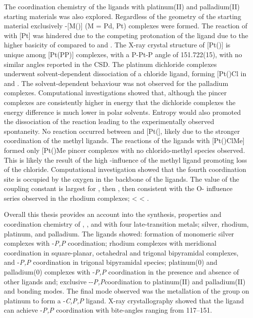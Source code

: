 The coordination chemistry of the \tBuxantphos{} ligands with platinum(II) and palladium(II) starting materials was also explored.  Regardless of the geometry of the starting material exclusively \trans{}-[M(\tBuxantphos)] (M = Pd, Pt) complexes were formed.  The reaction of \tBusixantphos{} with [Pt] was hindered due to the competing protonation of the ligand due to the higher basicity of \tBusixantphos{} compared to \tButhixantphos{} and \tBuxantphos{}.  The X-ray crystal structure of [Pt(\tBuxantphos)] is unique among [Pt(PP)] complexes, with a P-Pt-P angle of 151.722(15)\degrees{}, with no similar angles reported in the \gls{CSD}.  The platinum dichloride complexes underwent solvent-dependent dissociation of a chloride ligand, forming [Pt(\tBuxantphosk)Cl\ce{]+} in  and .  The solvent-dependent behaviour was not observed for the palladium complexes.  Computational investigations showed that, although the pincer complexes are consistently higher in energy that the dichloride complexes the energy difference is much lower in polar solvents.  Entropy would also promoted the dissociation of the reaction leading to the experimentally observed spontaneity.  No reaction occurred between \tButhixantphos{} and [Pt(], likely due to the stronger coordination of the methyl ligands.  The reactions of the \tBuxantphos{} ligands with [Pt()ClMe] formed only [Pt(\tBuxantphos)Me\ce{]+} pincer complexes with no chlorido-methyl species observed.  This is likely the result of the high \trans{}-influence of the methyl ligand promoting loss of the chloride.  Computational investigation showed that the fourth coordination site is occupied by the oxygen in the backbone of the \tBuxantphos{} ligands.  The value of the \JPtC{} coupling constant is largest for \tBusixantphos{}, then \tButhixantphos{}, then \tBuxantphos{} consistent with the O-\trans{} influence series observed in the rhodium complexes; \tBuxantphos{} \textless{} \tButhixantphos{} \textless{} \tBusixantphos.  

Overall this thesis provides an account into the synthesis, properties and coordination chemistry of \tBusixantphos, \tButhixantphos{}, and \tBuxantphos{} with four late-transition metals; silver, rhodium, platinum, and palladium.  The ligands showed: formation of monomeric silver complexes with \dento{}-\emph{P,P}\textprime{} coordination; rhodium complexes with meridional \POP{} coordination in square-planar, octahedral and trigonal bipyramidal complexes, and \dento{}-\emph{P,P}\textprime{} coordination in trigonal bipyramidal species; platinum(0) and palladium(0) complexes with \dento{}-\emph{P,P}\textprime{} coordination in the presence and absence of other ligands and; exclusive \trans{}-\dento{}-\emph{P,P}\textprime{}coordination to platinum(II) and palladium(II) and \POP{} bonding modes.  The final mode observed was the metallation of the \tBu{} group on platinum to form a \dento{}-\emph{C,P,P}\textprime{} ligand.  X-ray crystallography showed that the \tButhixantphos{} ligand can achieve \dento{}-\emph{P,P}\textprime{} coordination with bite-angles ranging from 117--151\degrees{}.  

